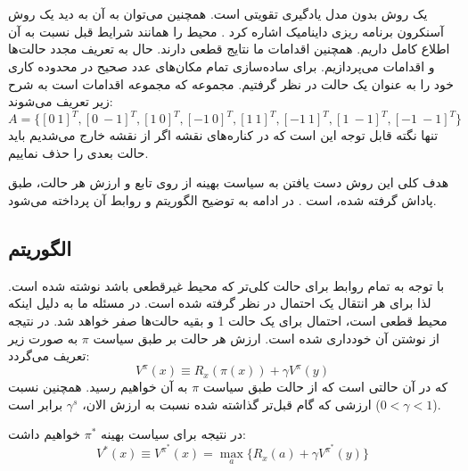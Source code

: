 \newpage
\section{}
یک روش بدون مدل یادگیری تقویتی است. همچنین می‌توان به آن به دید یک روش آسنکرون برنامه ریزی داینامیک اشاره کرد \cite{watkins1992q}. محیط را همانند شرایط قبل نسبت به آن اطلاع کامل داریم. همچنین اقدامات ما نتایج قطعی دارند. حال به تعریف مجدد حالت‌ها و اقدامات می‌پردازیم. برای ساده‌سازی تمام مکان‌های عدد صحیح در محدوده کاری خود را به عنوان یک حالت در نظر گرفتیم. مجموعه  که مجموعه اقدامات است به شرح زیر تعریف می‌شوند:
\begin{equation}\label{eq actions definition}
	A = \{[0~1]^T, [0~-1]^T, [1~0]^T, [-1~0]^T, [1~1]^T, [-1~1]^T, [1~-1]^T, [-1~-1]^T\}
\end{equation}
تنها نگته قابل توجه این است که در کناره‌های نقشه اگر از نقشه خارج می‌شدیم باید حالت بعدی را حذف نماییم. 

هدف کلی این روش دست یافتن به سیاست بهینه از روی تابع  و ارزش هر حالت،  طبق پاداش گرفته شده، است \cite{sutton1998introduction}. در ادامه به توضیح الگوریتم و روابط آن پرداخته می‌شود.

\subsection{الگوریتم }
با توجه به \cite{watkins1992q} تمام روابط برای حالت کلی‌تر که محیط غیرقطعی باشد نوشته شده است. لذا برای هر انتقال یک احتمال در نظر گرفته شده است. در مسئله ما به دلیل اینکه محیط قطعی است، احتمال برای یک حالت 1 و بقیه حالت‌ها صفر خواهد شد. در نتیجه از نوشتن آن خودداری شده است. ارزش هر حالت بر طبق سیاست $\pi$ به صورت زیر تعریف می‌گردد:
\begin{equation}
	V^\pi (x) \equiv R_x(\pi(x)) + \gamma V^\pi (y)
\end{equation}
که در آن  حالتی است که از حالت  طبق سیاست $\pi$ به آن خواهیم رسید. همچنین نسبت ارزشی که  گام قبل‌تر گذاشته شده نسبت به ارزش الان، $\gamma^s$ برابر است 
($0 < \gamma < 1$).

در نتیجه برای سیاست بهینه $\pi^*$ خواهیم داشت:
\begin{equation}
	V^*(x) \equiv V^{\pi^*} (x) = \max_{a}\{R_x(a) + \gamma V^{\pi^*} (y)\}
\end{equation}

